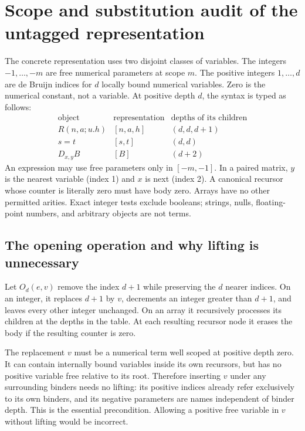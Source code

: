 \section{Scope and substitution audit of the untagged representation}

The concrete representation uses two disjoint classes of variables.
The integers $-1,\ldots,-m$ are free numerical parameters at scope $m$.
The positive integers $1,\ldots,d$ are de Bruijn indices for $d$ locally
bound numerical variables. Zero is the numerical constant, not a variable.
At positive depth $d$, the syntax is typed as follows:
\[
\begin{array}{c|c|c}
\text{object}&\text{representation}&\text{depths of its children}\\\hline
R(n,a;u.h)&[n,a,h]&(d,d,d+1)\\
s=t&[s,t]&(d,d)\\
D_{x,y}B&[B]&(d+2)
\end{array}
\]
An expression may use free parameters only in $[-m,-1]$. In a paired
matrix, $y$ is the nearest variable (index 1) and $x$ is next (index 2).
A canonical recursor whose counter is literally zero must have body zero.
Arrays have no other permitted arities. Exact integer tests exclude
booleans; strings, nulls, floating-point numbers, and arbitrary objects
are not terms.

\subsection{The opening operation and why lifting is unnecessary}

Let $O_d(e,v)$ remove the index $d+1$ while preserving the $d$ nearer
indices. On an integer, it replaces $d+1$ by $v$, decrements an integer
greater than $d+1$, and leaves every other integer unchanged. On an
array it recursively processes its children at the depths in the table.
At each resulting recursor node it erases the body if the resulting
counter is zero.

The replacement $v$ must be a numerical term well scoped at positive
depth zero. It can contain internally bound variables inside its own
recursors, but has no positive variable free relative to its root.
Therefore inserting $v$ under any surrounding binders needs no lifting:
its positive indices already refer exclusively to its own binders, and
its negative parameters are names independent of binder depth. This
is the essential precondition. Allowing a positive free variable in
$v$ without lifting would be incorrect.

